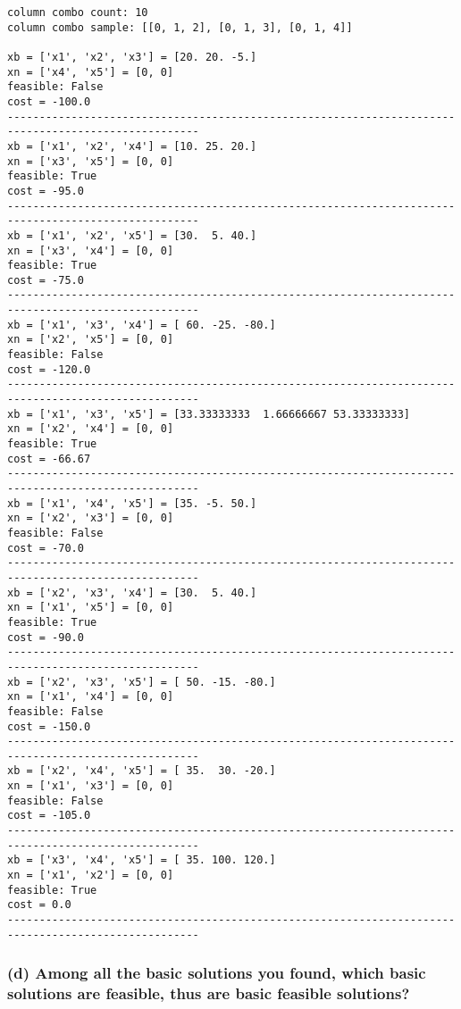 \documentclass[11pt]{article}
\begin{document}
    \begin{Verbatim}[commandchars=\\\{\}]
column combo count: 10
column combo sample: [[0, 1, 2], [0, 1, 3], [0, 1, 4]]

xb = ['x1', 'x2', 'x3'] = [20. 20. -5.]
xn = ['x4', 'x5'] = [0, 0]
feasible: False
cost = -100.0
----------------------------------------------------------------------------------------------------
xb = ['x1', 'x2', 'x4'] = [10. 25. 20.]
xn = ['x3', 'x5'] = [0, 0]
feasible: True
cost = -95.0
----------------------------------------------------------------------------------------------------
xb = ['x1', 'x2', 'x5'] = [30.  5. 40.]
xn = ['x3', 'x4'] = [0, 0]
feasible: True
cost = -75.0
----------------------------------------------------------------------------------------------------
xb = ['x1', 'x3', 'x4'] = [ 60. -25. -80.]
xn = ['x2', 'x5'] = [0, 0]
feasible: False
cost = -120.0
----------------------------------------------------------------------------------------------------
xb = ['x1', 'x3', 'x5'] = [33.33333333  1.66666667 53.33333333]
xn = ['x2', 'x4'] = [0, 0]
feasible: True
cost = -66.67
----------------------------------------------------------------------------------------------------
xb = ['x1', 'x4', 'x5'] = [35. -5. 50.]
xn = ['x2', 'x3'] = [0, 0]
feasible: False
cost = -70.0
----------------------------------------------------------------------------------------------------
xb = ['x2', 'x3', 'x4'] = [30.  5. 40.]
xn = ['x1', 'x5'] = [0, 0]
feasible: True
cost = -90.0
----------------------------------------------------------------------------------------------------
xb = ['x2', 'x3', 'x5'] = [ 50. -15. -80.]
xn = ['x1', 'x4'] = [0, 0]
feasible: False
cost = -150.0
----------------------------------------------------------------------------------------------------
xb = ['x2', 'x4', 'x5'] = [ 35.  30. -20.]
xn = ['x1', 'x3'] = [0, 0]
feasible: False
cost = -105.0
----------------------------------------------------------------------------------------------------
xb = ['x3', 'x4', 'x5'] = [ 35. 100. 120.]
xn = ['x1', 'x2'] = [0, 0]
feasible: True
cost = 0.0
----------------------------------------------------------------------------------------------------

    \end{Verbatim}

    \hypertarget{d-among-all-the-basic-solutions-you-found-which-basic-solutions-are-feasible-thus-are-basic-feasible-solutions}{%
\subsubsection{(d) Among all the basic solutions you found, which basic
solutions are feasible, thus are basic feasible
solutions?}\label{d-among-all-the-basic-solutions-you-found-which-basic-solutions-are-feasible-thus-are-basic-feasible-solutions}}
\end{document}
